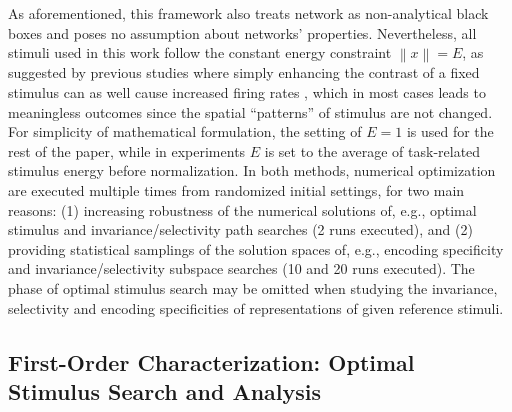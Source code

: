 As aforementioned, this framework also treats network as non-analytical black boxes and poses no assumption about networks' properties. Nevertheless, all stimuli used in this work follow the constant energy constraint $\left\| x \right\| = E$, as suggested by previous studies where simply enhancing the contrast of a fixed stimulus can as well cause increased firing rates \cite{albrecht1982striate, cheng1994comparison}, which in most cases leads to meaningless outcomes since the spatial ``patterns'' of stimulus are not changed. For simplicity of mathematical formulation, the setting of $E=1$ is used for the rest of the paper, while in experiments $E$ is set to the average of task-related stimulus energy before normalization. In both methods, numerical optimization are executed multiple times from randomized initial settings, for two main reasons: (1) increasing robustness of the numerical solutions of, e.g., optimal stimulus and invariance/selectivity path searches (2 runs executed), and (2) providing statistical samplings of the solution spaces of, e.g., encoding specificity and invariance/selectivity subspace searches (10 and 20 runs executed). The phase of optimal stimulus search may be omitted when studying the invariance, selectivity and encoding specificities of representations of given reference stimuli.


\subsection*{First-Order Characterization: Optimal Stimulus Search and Analysis}

